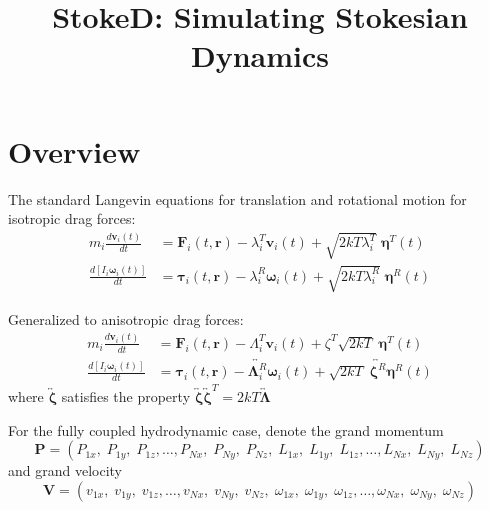 \documentclass[11pt]{article}
\title{StokeD: Simulating Stokesian Dynamics}
\date{}
\author{}
\begin{document}
\maketitle

\section{Overview}
The standard Langevin equations for translation and rotational motion for isotropic drag forces:
\begin{subequations}
\begin{align}
    m_i \frac{d\bm{v}_i(t)}{dt} &= \bm{F}_i(t, \bm{r}) - \lambda_i^T \bm{v}_i(t) + \sqrt{2kT\lambda_i^T} \; \bm{\eta}^T(t) \\
    \frac{d[I_i \bm{\omega}_i(t)]}{dt} &= \bm{\tau}_i(t, \bm{r}) - \lambda_i^R \bm{\omega}_i(t) + \sqrt{2kT\lambda_i^R} \; \bm{\eta}^R(t)
\end{align}
\end{subequations}

Generalized to anisotropic drag forces:
\begin{subequations}
\begin{align}
    m_i \frac{d\bm{v}_i(t)}{dt} &= \bm{F}_i(t, \bm{r}) - \Lambda_i^T \bm{v}_i(t) + \zeta^T \sqrt{2kT} \; \bm{\eta}^T(t) \\
\frac{d[I_i \bm{\omega}_i(t)]}{dt} &= \bm{\tau}_i(t, \bm{r}) - \overleftrightarrow{\bm{\Lambda}_i^R} \bm{\omega}_i(t) + \sqrt{2kT}\; \overleftrightarrow{\bm{\zeta}^R}  \bm{\eta}^R(t)
\end{align}
\end{subequations}
where $\overleftrightarrow{\bm{\zeta}}$ satisfies the property $\overleftrightarrow{\bm{\zeta}} \overleftrightarrow{\bm{\zeta}}^T = 2kT\overleftrightarrow{\bm{\Lambda}}$

For the fully coupled hydrodynamic case, denote the grand momentum
\begin{equation}
    \bm{P} = (P_{1x},\; P_{1y},\; P_{1z}, \ldots, P_{Nx},\; P_{Ny},\; P_{Nz},\;
    L_{1x},\; L_{1y},\; L_{1z}, \ldots, L_{Nx},\; L_{Ny},\; L_{Nz})
\end{equation}
and grand velocity
\begin{equation}
    \bm{V} = (v_{1x},\; v_{1y},\; v_{1z}, \ldots, v_{Nx},\; v_{Ny},\; v_{Nz},\;
    \omega_{1x},\; \omega_{1y},\; \omega_{1z}, \ldots, \omega_{Nx},\; \omega_{Ny},\; \omega_{Nz})
\end{equation}
\end{document}
